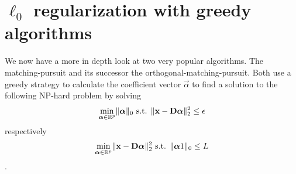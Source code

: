 


\section{$\ell_0$ regularization with greedy algorithms}
We now have a more in depth look at two very popular algorithms. 
The matching-pursuit and its successor the orthogonal-matching-pursuit.
Both use a greedy strategy to calculate the coefficient vector $\vec{\alpha}$ to
find a solution to the following NP-hard problem by solving
\begin{equation*}
\min_{\boldsymbol{\mathrm{\alpha}}\in\mathbb{R}^{p}}   \lVert \boldsymbol{\mathrm{\alpha}} \rVert_{0}   \textrm{
s.t. }
\lVert \boldsymbol{\mathrm{x}} - \boldsymbol{\mathrm{D}}\boldsymbol{\mathrm{\alpha}} \rVert^{2}_{2} \leq \epsilon
\end{equation*}
respectively
\begin{equation*}
\min_{\boldsymbol{\mathrm{\alpha}}\in\mathbb{R}^{p}}  \lVert \boldsymbol{\mathrm{x}} - \boldsymbol{\mathrm{D}}\boldsymbol{\mathrm{\alpha}}
\rVert^{2}_{2} \textrm{ s.t.
} \lVert \boldsymbol{\mathrm{\alpha}}	1 \rVert_{0} \leq L
\end{equation*}.

